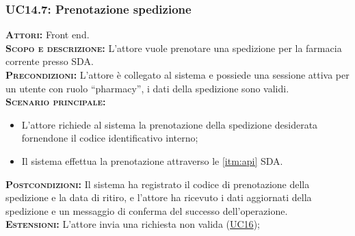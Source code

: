 \subsubsection{UC14.7: Prenotazione spedizione}
\label{sec:UC147}
\textsc{\textbf{Attori:}} Front end.\\
\textsc{\textbf{Scopo e descrizione:}} L'attore vuole prenotare una spedizione per la farmacia corrente presso SDA.\\
\textsc{\textsc{\textbf{Precondizioni:}}} L'attore è collegato al sistema e possiede una sessione attiva per un utente con ruolo ``pharmacy'', i dati della spedizione sono validi.\\
\textsc{\textbf{Scenario principale:}} 
\begin{itemize}
    \item L'attore richiede al sistema la prenotazione della spedizione desiderata fornendone il codice identificativo interno;
    \item Il sistema effettua la prenotazione attraverso le \ref{itm:api} SDA.
\end{itemize}
\textsc{\textbf{Postcondizioni:}} Il sistema ha registrato il codice di prenotazione della spedizione e la data di ritiro, e l'attore ha ricevuto i dati aggiornati della spedizione e un messaggio di conferma del successo dell'operazione.\\
\textsc{\textbf{Estensioni:}} L'attore invia una richiesta non valida (\hyperref[sec:UC16]{UC16});
